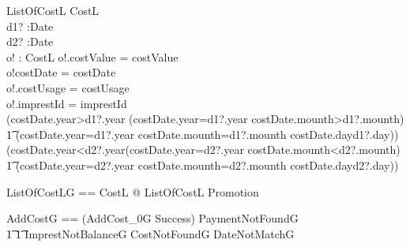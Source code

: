 \documentclass{article}
\begin{document}
\begin{schema}{ListOfCostL}
\Xi CostL\\
d1? :Date\\
d2? :Date\\
o! : CostL
\where
o!.costValue = costValue\\
o!costDate = costDate\\
o!.costUsage = costUsage\\
o!.imprestId = imprestId\\
(costDate.year>d1?.year \lor (costDate.year=d1?.year \land costDate.mounth>d1?.mounth) \lor\\
\t1 (costDate.year=d1?.year \land costDate.mounth=d1?.mounth \land costDate.day\ge d1?.day))\\
(costDate.year<d2?.year\lor (costDate.year=d2?.year \land costDate.mounth<d2?.mounth) \lor\\
\t1 (costDate.year=d2?.year \land costDate.mounth=d2?.mounth \land costDate.day\le d2?.day))
\end{schema}

\begin{zed}
ListOfCostLG == \exists \Delta CostL @ ListOfCostL \land Promotion
\end{zed}

\begin{zed}
AddCostG == (AddCost_0G \land Success) \lor PaymentNotFoundG \lor \\
\t1 \t1 ImprestNotBalanceG \lor CostNotFoundG \lor DateNotMatchG
\end{zed}
\end{document}
